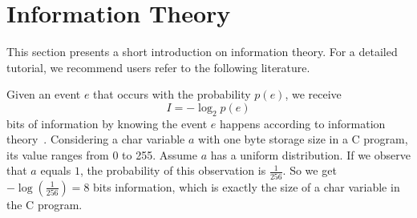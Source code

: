\begin{table}
    \centering
    \caption{Due to the page limit, we only shows some representations of the vast side-channel attacks: Attacks, the shared hardware resources with attackers, the granularity of the attacker can observe, is there any published attacks on non-cryptography library and if the type of attack can exploit multiple leakage sites.}
    \label{table:side_channel_attack}
    \end{table}
\section{Information Theory}
This section presents a short introduction on information theory. For a detailed tutorial, we recommend users refer to the following literature.

Given an event $e$ that occurs with the probability $p(e)$, we receive
\begin{displaymath}
    I = - \log_2p(e)
\end{displaymath}
bits of information by knowing the event $e$ happens according to information theory~\cite{shannon1948mathematical}. 
Considering a char variable $a$
with one byte storage size in a C program, its value ranges from 0 to 255.
Assume $a$ has a uniform distribution. If we observe that
$a$ equals $1$, the probability of this observation is $\frac{1}{256}$. So 
we get $-\log(\frac{1}{256}) = 8$ bits information, which is exactly the size
of a char variable in the C program.

